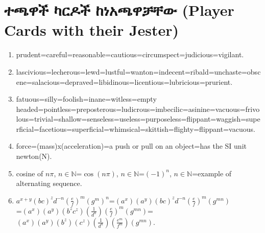 \documentclass[a4paper,12pt]{article}
\newenvironment{geez}{\geezfont}{}
\theoremstyle{mystyle}
\numberwithin{equation}{section}
\numberwithin{theorem}{section}
\numberwithin{proposition}{section}
\numberwithin{example}{section}
\numberwithin{remark}{section}
\numberwithin{lemma}{section}
\numberwithin{corollary}{section}
\numberwithin{definition}{section}
\numberwithin{amharicdefinition}{section}
\begin{document}
\section{\begin{geez}ተጫዋች ካርዶች ከነአጫዋቻቸው (Player Cards with their Jester)\end{geez}}
\label{S:3}
\begin{enumerate}
\item prudent=careful=reasonable=cautious=circumspect=judicious=vigilant.
\item lascivious=lecherous=lewd=lustful=wanton=indecent=ribald=unchaste=obscene=salacious=depraved=libidinous=licentious=lubricious=prurient.
\item fatuous=silly=foolish=inane=witless=empty headed=pointless=preposterous=ludicrous=imbecilic=asinine=vacuous=frivolous=trivial=shallow=senseless=useless=purposeless=flippant=waggish=superficial=facetious=superficial=whimsical=skittish=flighty=flippant=vacuous.
\item force=(mass)x(acceleration)=a push or pull on an object=has the SI unit newton(N).
\item cosine of $n\pi$, $n\in \mathbb{N}$=$\cos(n\pi)$, $n\in \mathbb{N}$=$(-1)^n$, $n\in \mathbb{N}$=example of alternating sequence.
\item $a^{x+y}(bc)^{z}d^{-n}\left(\frac{e}{f}\right)^m(g^m)^n$=$(a^{x})(a^{y})(bc)^{z}d^{-n}\left(\frac{e}{f}\right)^m(g^{mn})$\\=$(a^{x})(a^{y})(b^{z}c^{z})\left(\frac{1}{d^n}\right)\left(\frac{e}{f}\right)^m(g^{mn})$=$(a^{x})(a^{y})(b^z)(c^z)\left(\frac{1}{d^n}\right)\left(\frac{e^m}{f^m}\right)(g^{mn})$.
\end{enumerate}
\printbibliography
\end{document}
